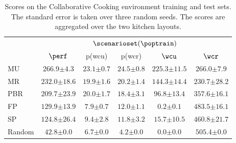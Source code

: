 \begin{table*}[t]
    \setlength{\tabcolsep}{3pt}
    \centering
    \caption{Scores on the Collaborative Cooking environment training and test sets. The standard error is taken over three random seeds. The scores are aggregated over the two kitchen layouts.}
    \label{tab:cooking.train}
    \begin{tabular}{lccccc}\toprule
    & \multicolumn{5}{c}{$\scenarioset(\poptrain)$}\\
    \cmidrule(lr){2-6}
               & $\perf$ & p(wcu) & p(wcr) & $\wcu$ & $\wcr$ \\ \midrule
        MU & $\mathbf{266.9 {\scriptscriptstyle\pm 4.3}}$ & $\mathbf{23.1 {\scriptscriptstyle\pm 0.7}}$ & $\mathbf{24.5 {\scriptscriptstyle\pm 0.8}}$ & $\mathbf{225.3 {\scriptscriptstyle\pm 11.5}}$ & $266.0 {\scriptscriptstyle\pm 7.9}$ \\
        MR & $232.0 {\scriptscriptstyle\pm 18.6}$ & $19.9 {\scriptscriptstyle\pm 1.6}$ & $20.2 {\scriptscriptstyle\pm 1.4}$ & $144.3 {\scriptscriptstyle\pm 14.4}$ & $\mathbf{230.7 {\scriptscriptstyle\pm 28.2}}$ \\ \hdashline
        PBR & $209.7 {\scriptscriptstyle\pm 23.9}$ & $20.0 {\scriptscriptstyle\pm 1.7}$ & $18.4 {\scriptscriptstyle\pm 3.1}$ & $96.8 {\scriptscriptstyle\pm 13.4}$ & $357.6 {\scriptscriptstyle\pm 16.1}$ \\
        FP & $129.9 {\scriptscriptstyle\pm 13.9}$ & $7.9 {\scriptscriptstyle\pm 0.7}$ & $12.0 {\scriptscriptstyle\pm 1.1}$ & $0.2 {\scriptscriptstyle\pm 0.1}$ & $483.5 {\scriptscriptstyle\pm 16.1}$ \\
        SP & $124.8 {\scriptscriptstyle\pm 26.4}$ & $9.4 {\scriptscriptstyle\pm 2.8}$ & $11.8 {\scriptscriptstyle\pm 3.2}$ & $15.7 {\scriptscriptstyle\pm 10.5}$ & $460.8 {\scriptscriptstyle\pm 21.7}$ \\
        Random & $42.8 {\scriptscriptstyle\pm 0.0}$ & $6.7 {\scriptscriptstyle\pm 0.0}$ & $4.2 {\scriptscriptstyle\pm 0.0}$ & $0.0 {\scriptscriptstyle\pm 0.0}$ & $505.4 {\scriptscriptstyle\pm 0.0}$ \\
    \bottomrule
    \end{tabular}
\end{table*}


